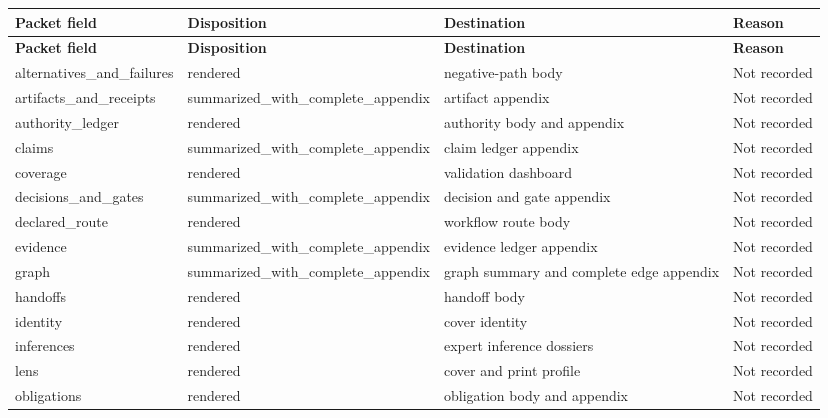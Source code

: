 \documentclass[10pt,a4paper]{article}
\begin{document}
\begin{longtable}{@{}>{\raggedright\arraybackslash}p{.18\linewidth}>{\raggedright\arraybackslash}p{.18\linewidth}>{\raggedright\arraybackslash}p{.22\linewidth}>{\raggedright\arraybackslash}p{.24\linewidth}@{}}
\toprule
\textbf{Packet field} & \textbf{Disposition} & \textbf{Destination} & \textbf{Reason}\\\midrule
\endfirsthead
\toprule
\textbf{Packet field} & \textbf{Disposition} & \textbf{Destination} & \textbf{Reason}\\\midrule
\endhead
alternativ\allowbreak{}es\_\allowbreak{}and\_\allowbreak{}failures & rendered & negative-\allowbreak{}path body & Not recorded\\
artifacts\_\allowbreak{}and\_\allowbreak{}receipts & summarized\allowbreak{}\_\allowbreak{}with\_\allowbreak{}complete\_\allowbreak{}appendix & artifact appendix & Not recorded\\
authority\_\allowbreak{}ledger & rendered & authority body and appendix & Not recorded\\
claims & summarized\allowbreak{}\_\allowbreak{}with\_\allowbreak{}complete\_\allowbreak{}appendix & claim ledger appendix & Not recorded\\
coverage & rendered & validation\allowbreak{} dashboard & Not recorded\\
decisions\_\allowbreak{}and\_\allowbreak{}gates & summarized\allowbreak{}\_\allowbreak{}with\_\allowbreak{}complete\_\allowbreak{}appendix & decision and gate appendix & Not recorded\\
declared\_\allowbreak{}route & rendered & workflow route body & Not recorded\\
evidence & summarized\allowbreak{}\_\allowbreak{}with\_\allowbreak{}complete\_\allowbreak{}appendix & evidence ledger appendix & Not recorded\\
graph & summarized\allowbreak{}\_\allowbreak{}with\_\allowbreak{}complete\_\allowbreak{}appendix & graph summary and complete edge appendix & Not recorded\\
handoffs & rendered & handoff body & Not recorded\\
identity & rendered & cover identity & Not recorded\\
inferences\allowbreak{} & rendered & expert inference dossiers & Not recorded\\
lens & rendered & cover and print profile & Not recorded\\
obligation\allowbreak{}s & rendered & obligation\allowbreak{} body and appendix & Not recorded\\

\end{longtable}
\end{document}
